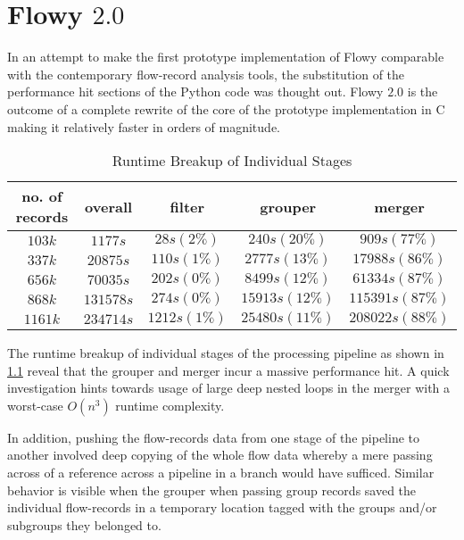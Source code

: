 \chapter{Flowy $2.0$}\label{ch:flowy-2}

In an attempt to make the first prototype implementation of Flowy comparable with the contemporary flow-record analysis tools, the substitution of the performance hit sections of the Python code was thought out. Flowy $2.0$ \cite{jschauer:thesis:2011} is the outcome of a complete rewrite of the core of the prototype implementation in C making it relatively faster in orders of magnitude.
 
\begin{table}[h!]
	\begin{tabular}{|c|c|c|c|c|}
	\hline	
	no. of records & overall & filter & grouper & merger \\
	\hline
	\hline 
	$103k$ & $1177s$ & $28s (2\%)$ & $240s (20\%)$ & $909s (77\%)$\\
	\hline 
	$337k$ & $20875s$ & $110s (1\%)$ & $2777s (13\%)$ & $17988s (86\%)$\\
	\hline
	$656k$ & $70035s$ & $202s (0\%)$ & $8499s (12\%)$ & $61334s (87\%)$\\
	\hline
	$868k$ & $131578s$ & $274s (0\%)$ & $15913s (12\%)$ & $115391s (87\%)$\\
	\hline
	$1161k$ & $234714s$ & $1212s (1\%)$ & $25480s (11\%)$ & $208022s (88\%)$\\
	\hline
	\end{tabular}
\caption{Runtime Breakup of Individual Stages \cite{jschauer:thesis:2011}}
\label{tab:flowy2-profiling}
\end{table}
The runtime breakup of individual stages of the processing pipeline as shown in \ref{tab:flowy2-profiling} reveal that the grouper and merger incur a massive performance hit. A quick investigation hints towards usage of large deep nested loops in the merger with a worst-case $O(n^3)$ runtime complexity.

In addition, pushing the flow-records data from one stage of the pipeline to another involved deep copying of the whole flow data whereby a mere passing across of a reference across a pipeline in a branch would have sufficed. Similar behavior is visible when the grouper when passing group records saved the individual flow-records in a temporary location tagged with the groups and/or subgroups they belonged to.

